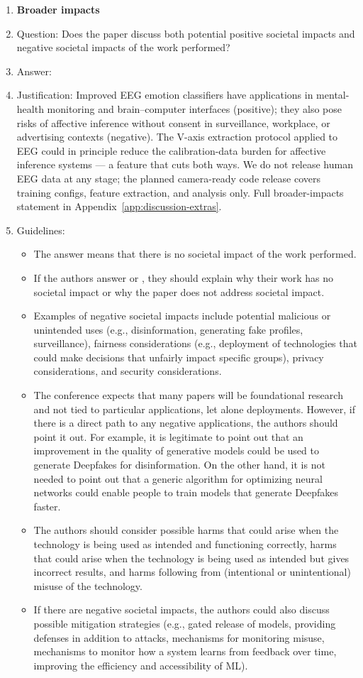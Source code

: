 \begin{enumerate}
\item {\bf Broader impacts}
    \item[] Question: Does the paper discuss both potential positive societal impacts and negative societal impacts of the work performed?
    \item[] Answer: \answerYes{}
    \item[] Justification: Improved EEG emotion classifiers have applications in mental-health monitoring and brain--computer interfaces (positive); they also pose risks of affective inference without consent in surveillance, workplace, or advertising contexts (negative). The V-axis extraction protocol applied to EEG could in principle reduce the calibration-data burden for affective inference systems --- a feature that cuts both ways. We do not release human EEG data at any stage; the planned camera-ready code release covers training configs, feature extraction, and analysis only. Full broader-impacts statement in Appendix~\ref{app:discussion-extras}.
    \item[] Guidelines:
    \begin{itemize}
        \item The answer \answerNA{} means that there is no societal impact of the work performed.
        \item If the authors answer \answerNA{} or \answerNo, they should explain why their work has no societal impact or why the paper does not address societal impact.
        \item Examples of negative societal impacts include potential malicious or unintended uses (e.g., disinformation, generating fake profiles, surveillance), fairness considerations (e.g., deployment of technologies that could make decisions that unfairly impact specific groups), privacy considerations, and security considerations.
        \item The conference expects that many papers will be foundational research and not tied to particular applications, let alone deployments. However, if there is a direct path to any negative applications, the authors should point it out. For example, it is legitimate to point out that an improvement in the quality of generative models could be used to generate Deepfakes for disinformation. On the other hand, it is not needed to point out that a generic algorithm for optimizing neural networks could enable people to train models that generate Deepfakes faster.
        \item The authors should consider possible harms that could arise when the technology is being used as intended and functioning correctly, harms that could arise when the technology is being used as intended but gives incorrect results, and harms following from (intentional or unintentional) misuse of the technology.
        \item If there are negative societal impacts, the authors could also discuss possible mitigation strategies (e.g., gated release of models, providing defenses in addition to attacks, mechanisms for monitoring misuse, mechanisms to monitor how a system learns from feedback over time, improving the efficiency and accessibility of ML).
    \end{itemize}


\end{enumerate}
